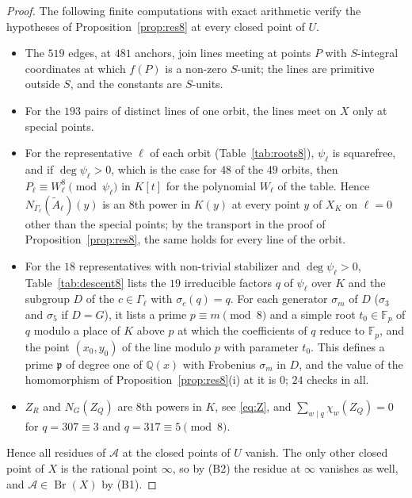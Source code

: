 \documentclass[11pt]{article}
\newcommand{\Q}{\mathbb{Q}}
\newcommand{\F}{\mathbb{F}}
\newcommand{\Br}{\operatorname{Br}}
\begin{document}
\begin{proof}
The following finite computations with exact arithmetic verify the hypotheses of Proposition~\ref{prop:res8} at every closed point of $U$.
\begin{itemize}
\item The $519$ edges, at $481$ anchors, join lines meeting at points $P$ with $S$-integral coordinates at which $f(P)$ is a non-zero $S$-unit; the lines are primitive outside $S$, and the constants are $S$-units.
\item For the $193$ pairs of distinct lines of one orbit, the lines meet on $X$ only at special points.
\item For the representative $\ell$ of each orbit (Table~\ref{tab:roots8}), $\psi_\ell$ is squarefree, and if $\deg\psi_\ell>0$, which is the case for $48$ of the $49$ orbits, then $P_\ell\equiv W_\ell^8\pmod{\psi_\ell}$ in $K[t]$ for the polynomial $W_\ell$ of the table. Hence $N_{\Gamma_\ell}(\tilde A_\ell)(y)$ is an $8$th power in $K(y)$ at every point $y$ of $X_K$ on $\ell=0$ other than the special points; by the transport in the proof of Proposition~\ref{prop:res8}, the same holds for every line of the orbit.
\item For the $18$ representatives with non-trivial stabilizer and $\deg\psi_\ell>0$, Table~\ref{tab:descent8} lists the $19$ irreducible factors $q$ of $\psi_\ell$ over $K$ and the subgroup $D$ of the $c\in\Gamma_\ell$ with $\sigma_c(q)=q$. For each generator $\sigma_m$ of $D$ ($\sigma_3$ and $\sigma_5$ if $D=G$), it lists a prime $p\equiv m\pmod8$ and a simple root $t_0\in\F_p$ of $q$ modulo a place of $K$ above $p$ at which the coefficients of $q$ reduce to $\F_p$, and the point $(x_0,y_0)$ of the line modulo $p$ with parameter $t_0$. This defines a prime $\mathfrak p$ of degree one of $\Q(x)$ with Frobenius $\sigma_m$ in $D$, and the value of the homomorphism of Proposition~\ref{prop:res8}(i) at it is $0$; $24$ checks in all.
\item $Z_R$ and $N_G(Z_Q)$ are $8$th powers in $K$, see \eqref{eq:Z}, and $\sum_{w\mid q}\chi_w(Z_Q)=0$ for $q=307\equiv3$ and $q=317\equiv5\pmod8$.
\end{itemize}
Hence all residues of $\mathcal A$ at the closed points of $U$ vanish. The only other closed point of $X$ is the rational point $\infty$, so by (B2) the residue at $\infty$ vanishes as well, and $\mathcal A\in\Br(X)$ by (B1).
\end{proof}
\end{document}
